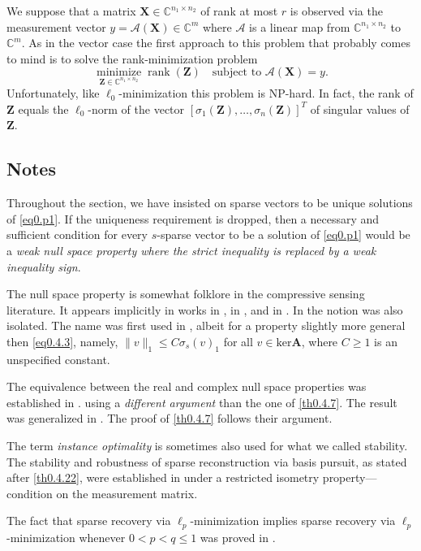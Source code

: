 We suppose that a matrix $\mathbf{X} \in \mathbb{C}^{n_1 \times n_2}$ of rank at most $r$ is observed via the measurement vector $y = \mathbf{\mathcal{A}}(\mathbf{X})\in \mathbb{C}^m$ where $\mathbf{\mathcal{A}}$ is a linear map from $\mathbb{C}^{n_1 \times n_2}$ to $\mathbb{C}^m$. As in the vector case the first approach to this problem that probably comes to mind is to solve the rank-minimization problem
\[
    \mathop{\mathrm{minimize}}\limits_{\mathbf{Z} \in \mathbb{C}^{n_1 \times n_2}} \mathop{\mathrm{rank}}(\mathbf{Z}) \quad \text{subject to } \mathbf{\mathcal{A}}(\mathbf{X}) = y.
\]
Unfortunately, like $\ell_0$-minimization this problem is NP-hard. In fact, the rank of $\mathbf{Z}$ equals the $\ell_0$-norm of the vector $[\sigma_1(\mathbf{Z}),\dots,\sigma_n(\mathbf{Z})]^T$ of singular values of $\mathbf{Z}$. 


\subsection{Notes}

Throughout the section, we have insisted on sparse vectors to be unique solutions of \cref{eq0.p1}. If the uniqueness requirement is dropped, then a necessary and sufficient condition for every $s$-sparse vector to be a solution of \cref{eq0.p1} would be a \textcolor[rgb]{1,0,0}{\emph{weak null space property where the strict inequality is replaced by a weak inequality sign}}.

The null space property is somewhat folklore in the compressive sensing literature. It appears implicitly in works in \cite{Donoho2003}, in \cite{Donoho2001}, and in \cite{Elad2002}. In \cite{Gribonval2003} the notion was also isolated. The name was first used in \cite{Cohen2009}, albeit for a property slightly more general then \cref{eq0.4.3}, namely, $\|v\|_1 \leq C\sigma_s(v)_1$ for all $v \in \text{ker}\mathbf{A}$, where $C \geq 1$ is an unspecified constant. 

The equivalence between the real and complex null space properties was established in \cite{Foucart2010}. using a \emph{\textcolor[rgb]{1,0,0}{different argument}} than the one of \cref{th0.4.7}. The result was generalized in \cite{Lai2011}. The proof of \cref{th0.4.7} follows their argument.

The term \emph{\textcolor[rgb]{1,0,0}{instance optimality}} is sometimes also used for what we called stability. The stability and robustness of sparse reconstruction via basis pursuit, as stated after \cref{th0.4.22}, were established in \cite{Candes2006a} under a restricted isometry property---condition on the measurement matrix.

The fact that sparse recovery via $\ell_p$-minimization implies sparse recovery via $\ell_p$-minimization whenever $0<p<q\leq 1$ was proved in \cite{Gribonval2007}. 








